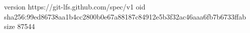 version https://git-lfs.github.com/spec/v1
oid sha256:99ed86738aa1b4cc2800b0e67a88187c84912e5b3f32ac46aaa6fb7b6733ffab
size 87544

